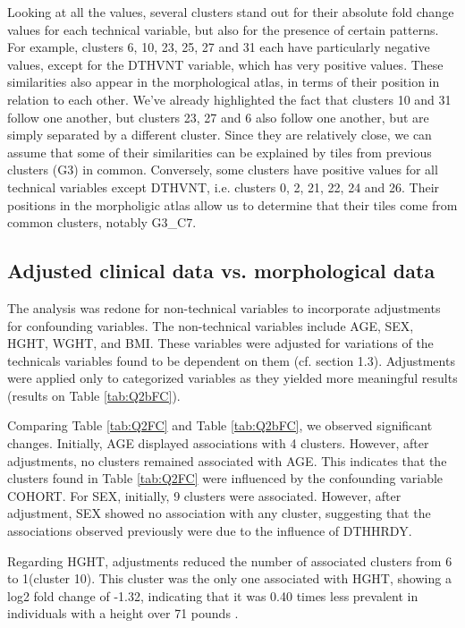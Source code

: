 \documentclass[a4paper, 11pt]{article}
\begin{document}
\begin{multicols}{2}
Looking at all the values, several clusters stand out for their absolute fold change values for each technical variable, but also for the presence of certain patterns. For example, clusters 6, 10, 23, 25, 27 and 31 each have particularly negative values, except for the DTHVNT variable, which has very positive values. These similarities also appear in the morphological atlas, in terms of their position in relation to each other. We've already highlighted the fact that clusters 10 and 31 follow one another, but clusters 23, 27 and 6 also follow one another, but are simply separated by a different cluster. Since they are relatively close, we can assume that some of their similarities can be explained by tiles from previous clusters (G3) in common. Conversely, some clusters have positive values for all technical variables except DTHVNT, i.e. clusters 0, 2, 21, 22, 24 and 26. Their positions in the morpholigic atlas allow us to determine that their tiles come from common clusters, notably G3\_C7.

\subsection{Adjusted clinical data vs. morphological data}
The analysis was redone for non-technical variables to incorporate adjustments for confounding variables. The non-technical variables include AGE, SEX, HGHT, WGHT, and BMI. These variables were adjusted for variations  of the technicals variables found to be dependent on them (cf. section 1.3). 
Adjustments were applied only to categorized variables as they yielded more meaningful results (results on Table \ref{tab:Q2bFC}).

Comparing Table \ref{tab:Q2FC} and Table \ref{tab:Q2bFC}, we observed significant changes. Initially, AGE displayed associations with 4 clusters. However, after adjustments, no clusters remained associated with AGE. This indicates that the clusters found in Table \ref{tab:Q2FC} were influenced by the confounding variable COHORT.
For SEX, initially, 9 clusters were associated. However, after adjustment, SEX showed no association with any cluster, suggesting that the associations observed previously were due to the influence of DTHHRDY.

Regarding HGHT, adjustments reduced the number of associated clusters from 6 to 1(cluster 10). This cluster was the only one associated with HGHT, showing a log2 fold change of -1.32, indicating that it was 0.40 times less prevalent in individuals with a height over 71 pounds . 


\end{multicols}
\end{document}
